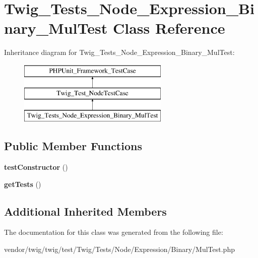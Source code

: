 \hypertarget{classTwig__Tests__Node__Expression__Binary__MulTest}{}\section{Twig\+\_\+\+Tests\+\_\+\+Node\+\_\+\+Expression\+\_\+\+Binary\+\_\+\+Mul\+Test Class Reference}
\label{classTwig__Tests__Node__Expression__Binary__MulTest}
Inheritance diagram for Twig\+\_\+\+Tests\+\_\+\+Node\+\_\+\+Expression\+\_\+\+Binary\+\_\+\+Mul\+Test\+:\begin{figure}[H]
\begin{center}
\leavevmode
\includegraphics[height=3.000000cm]{classTwig__Tests__Node__Expression__Binary__MulTest}
\end{center}
\end{figure}
\subsection*{Public Member Functions}
\begin{DoxyCompactItemize}
\item 
{\bfseries test\+Constructor} ()\hypertarget{classTwig__Tests__Node__Expression__Binary__MulTest_a1780e118f92b97e82cbfe1524485df3b}{}\label{classTwig__Tests__Node__Expression__Binary__MulTest_a1780e118f92b97e82cbfe1524485df3b}

\item 
{\bfseries get\+Tests} ()\hypertarget{classTwig__Tests__Node__Expression__Binary__MulTest_ae023ef43cbf1653417724a1b31b9a665}{}\label{classTwig__Tests__Node__Expression__Binary__MulTest_ae023ef43cbf1653417724a1b31b9a665}

\end{DoxyCompactItemize}
\subsection*{Additional Inherited Members}


The documentation for this class was generated from the following file\+:\begin{DoxyCompactItemize}
\item 
vendor/twig/twig/test/\+Twig/\+Tests/\+Node/\+Expression/\+Binary/Mul\+Test.\+php\end{DoxyCompactItemize}

